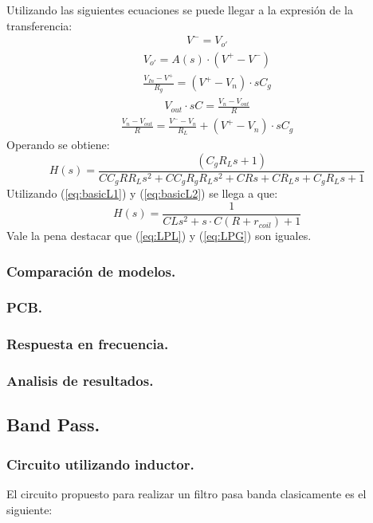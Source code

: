 \documentclass[a4paper]{article}
\begin{document}
Utilizando las siguientes ecuaciones se puede llegar a la expresión de la transferencia:
\begin{align}V^- = V_{o'}\end{align}
\begin{align}V_{o'} = A(s)\cdot (V^+-V^-)\end{align}
\begin{align}\frac{V_{In}-V^+}{R_g}=(V^+-V_n)\cdot s C_g\end{align}
\begin{align}V_{out}\cdot s C=\frac{V_{n}-V_{out}}{R}\end{align}
\begin{align}\frac{V_{n}-V_{out}}{R}=\frac{V^--V_n}{R_L} +(V^+-V_n)\cdot s C_g\end{align}
Operando se obtiene:
\begin{equation} H(s)= \frac{\left(C_g R_L s + 1\right)}{C C_g R R_L s^{2} + C C_g R_g R_L s^{2} + C R s + C R_L s + C_g R_L s + 1}
\end{equation}
Utilizando (\ref{eq:basicL1}) y (\ref{eq:basicL2}) se llega a que:
\begin{equation} H(s)= \frac{1}{C L s^{2} + s\cdot C (R+r_{coil}) + 1}
\label{eq:LPG}
\end{equation}
Vale la pena destacar que (\ref{eq:LPL}) y (\ref{eq:LPG}) son iguales.
\subsubsection{Comparación de modelos.}
\subsubsection{PCB.}
\subsubsection{Respuesta en frecuencia.}
\subsubsection{Analisis de resultados.}
\newpage
\subsection{Band Pass.}
\subsubsection{Circuito utilizando inductor.}
El circuito propuesto para realizar un filtro pasa banda clasicamente es el siguiente:
\end{document}
